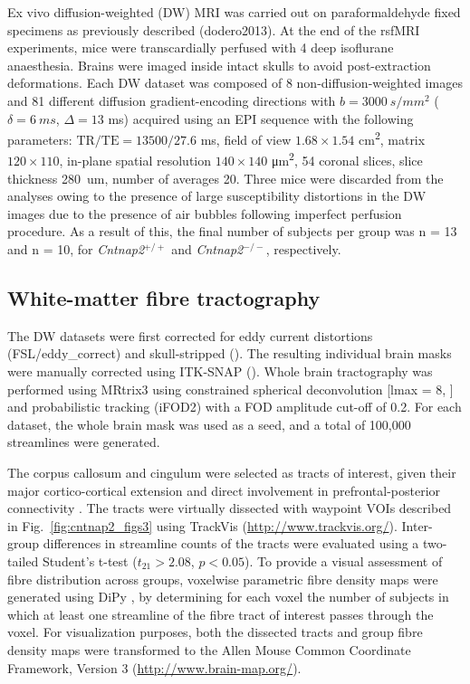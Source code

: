 Ex vivo diffusion-weighted (DW) MRI was carried out on paraformaldehyde fixed
specimens as previously described (dodero2013). At the end of the rsfMRI
experiments, mice were transcardially perfused with 4%
deep isoflurane anaesthesia. Brains were imaged inside intact skulls to avoid
post-extraction deformations. Each DW dataset was composed of 8
non-diffusion-weighted images and 81 different diffusion gradient-encoding
directions with $b=\SI{3000}{s/mm^2}$ ($\delta=\SI{6}{ms}$, $\Delta=13$ ms) acquired using an
EPI sequence with the following parameters: $\text{TR/TE}=13500/27.6$ \si{ms}, field of view
$1.68 \times 1.54$ \si{cm^2}, matrix $120 \times 110$, in-plane spatial resolution
$140 \times 140$ \si{\um^2}, 54 coronal slices, slice thickness \SI{280}{um}, number of
averages 20. Three mice were discarded from the analyses owing to the presence
of large susceptibility distortions in the DW images due to the presence of air
bubbles following imperfect perfusion procedure. As a result of this, the final
number of subjects per group was n = 13 and n = 10, for \textit{Cntnap2}$^{+/+}$ and
\textit{Cntnap2}$^{-/-}$, respectively.

\subsection{White-matter fibre tractography}

The DW datasets were first corrected for eddy current distortions
(FSL/eddy\_correct) and skull-stripped (\parencite{oguz2014}). The resulting
individual brain masks were manually corrected using ITK-SNAP
(\parencite{yushkevich2006}). Whole brain tractography was performed using
MRtrix3 \parencite{tournier2012} using constrained spherical deconvolution [lmax
= 8, \parencite{tournier2007}] and probabilistic tracking (iFOD2) with a FOD
amplitude cut-off of 0.2. For each dataset, the whole brain mask was used as a
seed, and a total of 100,000 streamlines were generated.

The corpus callosum and cingulum were selected as tracts of interest, given
their major cortico-cortical extension and direct involvement in
prefrontal-posterior connectivity \parencite{vogt2014}. The tracts were
virtually dissected with waypoint VOIs described in Fig.~\ref{fig:cntnap2_figs3}
using TrackVis (\url{http://www.trackvis.org/}). Inter-group differences in streamline
counts of the tracts were evaluated using a two-tailed Student’s t-test ($t_{21} >
2.08$, $p < 0.05$). To provide a visual assessment of fibre distribution across
groups, voxelwise parametric fibre density maps were generated using DiPy
\parencite{garyfallidis2014}, by determining for each voxel the number of
subjects in which at least one streamline of the fibre tract of interest passes
through the voxel. For visualization purposes, both the dissected tracts and
group fibre density maps were transformed to the Allen Mouse Common Coordinate
Framework, Version 3 (\url{http://www.brain-map.org/}).

